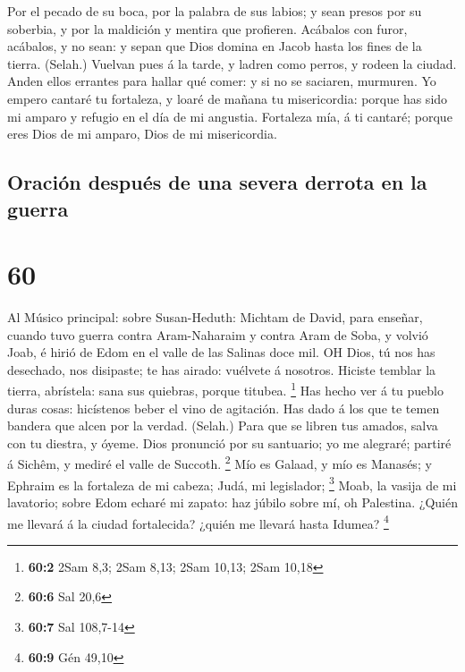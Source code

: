  Por el pecado de su boca, por la palabra de sus labios; y
sean presos por su soberbia, y por la maldición y mentira que profieren.
 Acábalos con furor, acábalos, y no sean: y sepan que Dios
domina en Jacob hasta los fines de la tierra. (Selah.) 
Vuelvan pues á la tarde, y ladren como perros, y rodeen la ciudad.
 Anden ellos errantes para hallar qué comer: y si no se
saciaren, murmuren.  Yo empero cantaré tu fortaleza, y
loaré de mañana tu misericordia: porque has sido mi amparo y refugio en
el día de mi angustia.  Fortaleza mía, á ti cantaré; porque
eres Dios de mi amparo, Dios de mi misericordia.

\hypertarget{oraciuxf3n-despuuxe9s-de-una-severa-derrota-en-la-guerra}{%
\subsection{Oración después de una severa derrota en la
guerra}\label{oraciuxf3n-despuuxe9s-de-una-severa-derrota-en-la-guerra}}

\hypertarget{section-59}{%
\section{60}\label{section-59}}

 Al Músico principal: sobre Susan-Heduth: Michtam de David,
para enseñar, cuando tuvo guerra contra Aram-Naharaim y contra Aram de
Soba, y volvió Joab, é hirió de Edom en el valle de las Salinas doce
mil. OH Dios, tú nos has desechado, nos disipaste; te has airado:
vuélvete á nosotros.  Hiciste temblar la tierra, abrístela:
sana sus quiebras, porque titubea. \footnote{\textbf{60:2} 2Sam 8,3;
  2Sam 8,13; 2Sam 10,13; 2Sam 10,18}  Has hecho ver á tu
pueblo duras cosas: hicístenos beber el vino de agitación. 
Has dado á los que te temen bandera que alcen por la verdad. (Selah.)
 Para que se libren tus amados, salva con tu diestra, y
óyeme.  Dios pronunció por su santuario; yo me alegraré;
partiré á Sichêm, y mediré el valle de Succoth. \footnote{\textbf{60:6}
  Sal 20,6}  Mío es Galaad, y mío es Manasés; y Ephraim es
la fortaleza de mi cabeza; Judá, mi legislador; \footnote{\textbf{60:7}
  Sal 108,7-14}  Moab, la vasija de mi lavatorio; sobre Edom
echaré mi zapato: haz júbilo sobre mí, oh Palestina.  ¿Quién
me llevará á la ciudad fortalecida? ¿quién me llevará hasta Idumea?
\footnote{\textbf{60:9} Gén 49,10}

